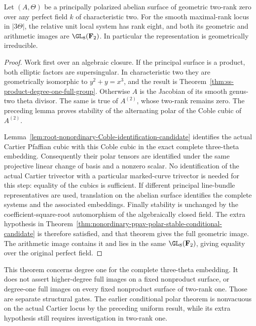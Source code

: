 \begin{theorem}
\label{thm:p-rank-zero-ppav-degree-one-full-candidate}
Let $(A,\Theta)$ be a principally polarized abelian surface of
geometric two-rank zero over any perfect field $k$ of characteristic
two. For the smooth maximal-rank locus in $|3\Theta|$, the relative
unit local system has rank eight, and both its geometric and
arithmetic images are $\GL_8(\mathbf F_2)$.
In particular the representation is geometrically irreducible.
\end{theorem}
\begin{proof}
Work first over an algebraic closure. If the principal surface is
a product, both elliptic factors are supersingular. In characteristic
two they are geometrically isomorphic to $y^2+y=x^3$, and the result
is Theorem~\ref{thm:ss-product-degree-one-full-group}.
Otherwise $A$ is the Jacobian of its smooth genus-two theta divisor.
The same is true of $A^{(2)}$, whose two-rank remains zero.
The preceding lemma proves stability of the alternating polar of
the Coble cubic of $A^{(2)}$.

Lemma~\ref{lem:root-nonordinary-Coble-identification-candidate}
identifies the actual Cartier Pfaffian cubic with this Coble cubic
in the exact complete three-theta embedding. Consequently their
polar tensors are identified under the same projective linear
change of basis and a nonzero scalar. No identification of the
actual Cartier trivector with a particular marked-curve trivector
is needed for this step: equality of the cubics is sufficient.
If different principal line-bundle representatives are used,
translation on the abelian surface identifies the complete systems
and the associated embeddings. Finally stability is unchanged by
the coefficient-square-root automorphism of the algebraically
closed field. The extra hypothesis in
Theorem~\ref{thm:nonordinary-ppav-polar-stable-conditional-candidate}
is therefore satisfied, and that theorem gives the full geometric
image. The arithmetic image contains it and lies in the same
$\GL_8(\mathbf F_2)$, giving equality over the original perfect field.
\end{proof}

\begin{remark}
\label{rem:p-rank-zero-ppav-degree-one-scope-candidate}
This theorem concerns degree one for the complete three-theta
embedding. It does not assert higher-degree full images on a fixed
nonproduct surface, or degree-one full images on every fixed
nonproduct surface of two-rank one. Those are separate structural
gates. The earlier conditional polar theorem is nonvacuous on the
actual Cartier locus by the preceding uniform result, while its
extra hypothesis still requires investigation in two-rank one.
\end{remark}
